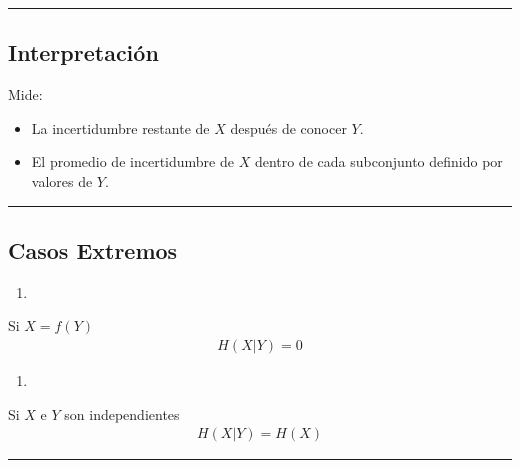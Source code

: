 \documentclass[letterpaper,10pt,english]{jupyterBook}
\begin{document}
\bigskip\hrule\bigskip



\subsection{Interpretación}
\label{\detokenize{01_theory/conditional_entropy:id2}}
\sphinxAtStartPar
Mide:
\begin{itemize}
\item {} 
\sphinxAtStartPar
La incertidumbre restante de \(X\) después de conocer \(Y\).

\item {} 
\sphinxAtStartPar
El promedio de incertidumbre de \(X\) dentro de cada subconjunto definido por
valores de \(Y\).

\end{itemize}


\bigskip\hrule\bigskip



\subsection{Casos Extremos}
\label{\detokenize{01_theory/conditional_entropy:casos-extremos}}\begin{enumerate}
%
\item {} 
\sphinxAtStartPar
{}

\end{enumerate}

\sphinxAtStartPar
Si \(X=f(Y)\)
\begin{equation*}
\begin{split}
H(X|Y)=0
\end{split}
\end{equation*}\begin{enumerate}
%
\setcounter{enumi}{1}
\item {} 
\sphinxAtStartPar
{}

\end{enumerate}

\sphinxAtStartPar
Si \(X\) e \(Y\) son independientes
\begin{equation*}
\begin{split}
H(X|Y)=H(X)
\end{split}
\end{equation*}

\bigskip\hrule\bigskip
\end{document}
